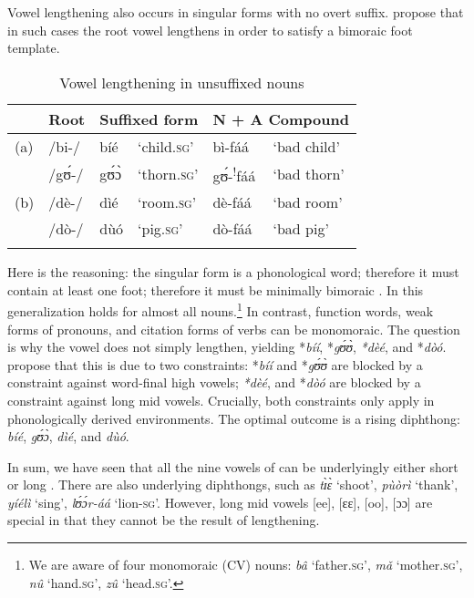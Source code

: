 \documentclass[output=paper,newtxmath,modfonts,nonflat,draftmode]{langsci/langscibook}
\begin{document}
\newpage 
{Vowel lengthening also occurs in singular forms with no overt suffix. \citet{Anttila&Bodomo2009} propose that in such cases the root vowel lengthens in order to satisfy a bimoraic foot template.}

\begin{table}
\begin{tabularx}{\textwidth}{lXlXlX}
\lsptoprule
& {Root} & \multicolumn{2}{l}{{Suffixed form}}  & \multicolumn{2}{l}{{N + A Compound}} \\
\midrule
(a) & /bi-/ & bíé & ‘child.\textsc{sg}’ & bì-fáá & ‘bad child’\\
& /gʊ́-/ & gʊ́ɔ̀ & ‘thorn.\textsc{sg}’ & gʊ́-\textsuperscript{!}fáá & ‘bad thorn’\\
\tablevspace
(b) & /dè-/ & dìé & ‘room.\textsc{sg}’ & dè-fáá & ‘bad room’\\
& /dò-/ & dùó & ‘pig.\textsc{sg}’ & dò-fáá & ‘bad pig’\\
\lspbottomrule
\end{tabularx}
\caption{Vowel lengthening in unsuffixed nouns}
\label{tab:anttila:4}
\end{table}
 

{Here is the reasoning: the singular form is a phonological word; therefore it must contain at least one foot; therefore it must be minimally bimoraic \citep{McCarthyPrince1996}. In  this generalization holds for almost all nouns.}\footnote{We are aware of four monomoraic (CV) nouns: \textit{bâ} ‘father.\textsc{sg}’, \textit{mǎ} ‘mother.\textsc{sg}’, \textit{nû} ‘hand.\textsc{sg’,} \textit{zû} ‘head.\textsc{sg}’.}{  In contrast, function words, weak forms of pronouns, and citation forms of verbs can be monomoraic. The question is why the vowel does not simply lengthen, yielding *}{\textit{bíí}}{, *}{\textit{g}}{\textit{ʊ́ʊ̀}}{,} {\textit{*}}{\textit{dèé}}{, and *}{\textit{dòó}}{.} {} \citet{Anttila&Bodomo2009} propose that this is due to two constraints: {*}{\textit{bíí}}{ and *}{\textit{g}}{\textit{ʊ́ʊ̀}}{} {are blocked by a constraint against word-final high vowels;} {\textit{*}}{\textit{dèé}}{, and *}{\textit{dòó} }{are blocked by} {a constraint against long mid vowels. Crucially, both constraints only apply in phonologically derived environments. The optimal outcome is} {a rising diphthong:} {\textit{bíé}}{,} {\textit{g}}{\textit{ʊ́ɔ̀}}{,} {\textit{dìé}}{, and} {\textit{dùó}}{.} 



{In sum, we have seen that all the nine vowels of  can be underlyingly either short or long \citep{Kennedy1966}. There are also underlying diphthongs, such as} {\textit{t\`ɪ\`ɛ}}{ ‘shoot’,} {\textit{pùòrì}}{ ‘thank’,} {\textit{yíélì}}{ ‘sing’,} {\textit{lʊ́ɔ́r-áá}}{ ‘lion-}{\textsc{sg}}{’. However, long mid vowels} {[ee], [ɛɛ], [oo], [ɔɔ]} {are special in that they cannot be the result of lengthening.}
\end{document}
